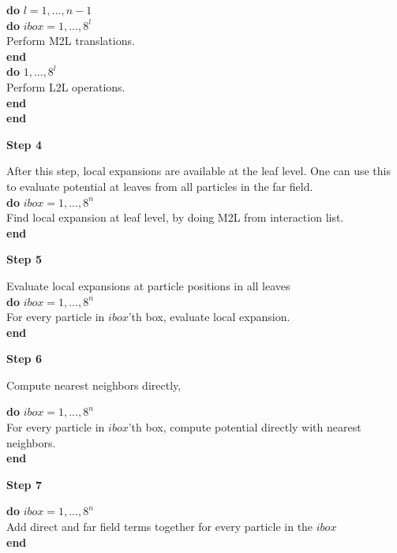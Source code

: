 \noindent \textbf{do} $l=1,...,n-1$ \\
\indent \textbf{do} $\textit{ibox}=1,...,8^l$ \\
\indent \indent Perform M2L translations. \\
\indent \textbf{end} \\
\indent \textbf{do} $1,...,8^l$ \\
\indent \indent Perform L2L operations.\\
\indent \textbf{end} \\
\noindent \textbf{end}\\

\begin{center}
    \textbf{Step 4}
\end{center}

After this step, local expansions are available at the leaf level. One can use
this to evaluate potential at leaves from all particles in the far field.\\

\noindent \textbf{do} $\textit{ibox}=1,...,8^n$ \\
\indent Find local expansion at leaf level, by doing M2L from interaction list. \\
\noindent \textbf{end}

\begin{center}
    \textbf{Step 5}
\end{center}
Evaluate local expansions at particle positions in all leaves\\

\noindent \textbf{do} $\textit{ibox}=1,...,8^n$ \\
\indent For every particle in $\textit{ibox}$'th box, evaluate local expansion. \\
\noindent \textbf{end} \\

\begin{center}
    \textbf{Step 6}
\end{center}
Compute nearest neighbors directly,

\noindent \textbf{do} $\textit{ibox}=1,...,8^n$ \\
\indent For every particle in $\textit{ibox}$'th box, compute potential directly with nearest neighbors. \\
\noindent \textbf{end} \\


\begin{center}
    \textbf{Step 7}
\end{center}

\noindent \textbf{do} $\textit{ibox}=1,...,8^n$ \\
\indent Add direct and far field terms together for every particle in the $\textit{ibox}$\\
\noindent \textbf{end} \\
